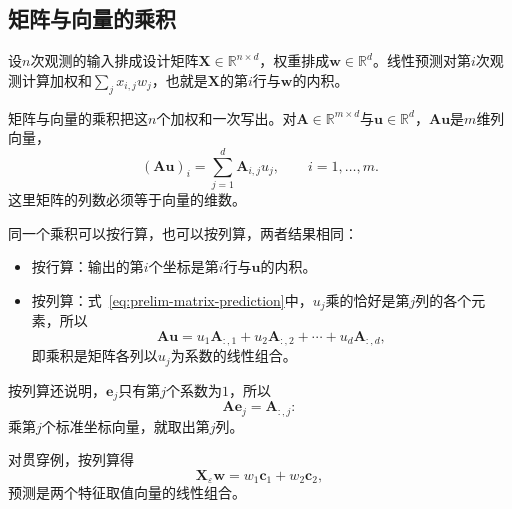 \subsection{矩阵与向量的乘积}
\label{sec:prelim-matrix-records-prediction}

设$n$次观测的输入排成设计矩阵$\bm X\in\mathbb R^{n\times d}$，权重排成$\bm w\in\mathbb R^d$。线性预测对第$i$次观测计算加权和$\sum_j x_{i,j}w_j$，也就是$\bm X$的第$i$行与$\bm w$的内积。

矩阵与向量的乘积把这$n$个加权和一次写出。对$\bm A\in\mathbb R^{m\times d}$与$\bm u\in\mathbb R^d$，$\bm A\bm u$是$m$维列向量，
\begin{equation}
(\bm A\bm u)_i=\sum_{j=1}^d\bm A_{i,j}u_j,\qquad i=1,\ldots,m.
\label{eq:prelim-matrix-prediction}
\end{equation}
这里矩阵的列数必须等于向量的维数。

同一个乘积可以按行算，也可以按列算，两者结果相同：
\begin{itemize}
 \item 按行算：输出的第$i$个坐标是第$i$行与$\bm u$的内积。
 \item 按列算：式~\eqref{eq:prelim-matrix-prediction}中，$u_j$乘的恰好是第$j$列的各个元素，所以
 \[
  \bm A\bm u=u_1\bm A_{:,1}+u_2\bm A_{:,2}+\cdots+u_d\bm A_{:,d},
 \]
 即乘积是矩阵各列以$u_j$为系数的线性组合。
\end{itemize}
按列算还说明，$\bm e_j$只有第$j$个系数为$1$，所以
\[
 \bm A\bm e_j=\bm A_{:,j}:
\]
乘第$j$个标准坐标向量，就取出第$j$列。

对贯穿例，按列算得
\[
 \bm X_\varepsilon\bm w=w_1\bm c_1+w_2\bm c_2,
\]
预测是两个特征取值向量的线性组合。

